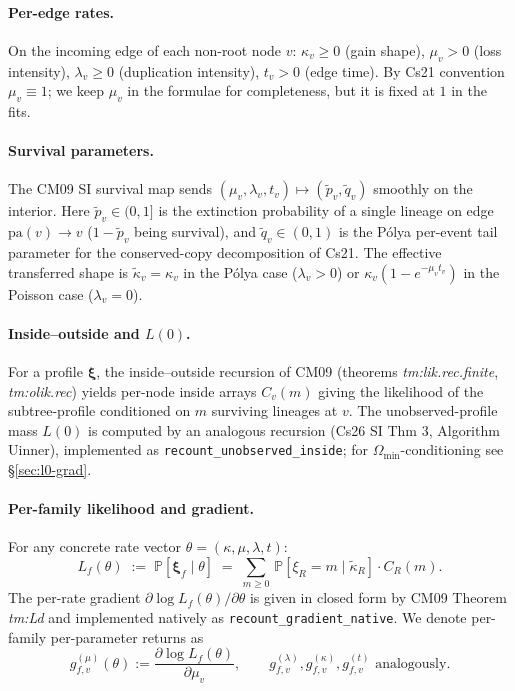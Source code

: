 \documentclass[11pt]{article}
\newcommand{\PROB}{\mathbb{P}}
\newcommand{\pa}{\mathrm{pa}}
\newcommand{\troot}{R}
\newcommand{\Prof}{\boldsymbol{\xi}}
\newcommand{\rate}{\kappa}
\newcommand{\dup}{\lambda}
\newcommand{\loss}{\mu}
\newcommand{\edgelen}{t}
\newcommand{\survp}{\tilde p}
\newcommand{\survq}{\tilde q}
\newcommand{\Om}{\Omega}
\theoremstyle{definition}
\begin{document}
\paragraph{Per-edge rates.}
On the incoming edge of each non-root node $v$:
$\rate_v\ge0$ (gain shape), $\loss_v > 0$ (loss intensity),
$\dup_v\ge 0$ (duplication intensity), $\edgelen_v > 0$ (edge time).
By Cs21 convention $\loss_v \equiv 1$; we keep $\loss_v$ in the
formulae for completeness, but it is fixed at $1$ in the fits.

\paragraph{Survival parameters.}
The CM09 SI survival map sends
$(\loss_v, \dup_v, \edgelen_v) \mapsto (\survp_v, \survq_v)$ smoothly
on the interior. Here $\survp_v \in (0,1]$ is the extinction
probability of a single lineage on edge $\pa(v)\to v$
($1-\survp_v$ being survival), and $\survq_v \in (0,1)$ is the
Pólya per-event tail parameter for the conserved-copy decomposition
of Cs21. The effective transferred shape is
$\tilde\rate_v = \rate_v$ in the Pólya case
($\dup_v > 0$) or $\rate_v(1 - e^{-\loss_v\edgelen_v})$ in the
Poisson case ($\dup_v = 0$).

\paragraph{Inside--outside and $L(0)$.}
For a profile $\Prof$, the inside--outside recursion of CM09
(theorems \emph{tm:lik.rec.finite}, \emph{tm:olik.rec}) yields
per-node inside arrays $C_v(m)$ giving the likelihood of the
subtree-profile conditioned on $m$ surviving lineages at $v$.
The unobserved-profile mass $L(0)$ is computed by an analogous
recursion (Cs26 SI Thm 3, Algorithm Uinner), implemented as
\texttt{recount\_unobserved\_inside}; for $\Om_{\min}$-conditioning
see \S\ref{sec:l0-grad}.

\paragraph{Per-family likelihood and gradient.}
For any concrete rate vector $\theta = (\rate, \loss, \dup, \edgelen)$:
\begin{equation}
L_f(\theta) \;:=\; \PROB[\Prof_f \mid \theta]
\;=\; \sum_{m\ge 0}\,\PROB[\xi_\troot = m \mid \tilde\rate_\troot]
                     \cdot C_\troot(m).
\end{equation}
The per-rate gradient $\partial \log L_f(\theta)/\partial\theta$ is
given in closed form by CM09 Theorem \emph{tm:Ld} and implemented
natively as \texttt{recount\_gradient\_native}. We denote per-family
per-parameter returns as
\begin{equation}
g^{(\loss)}_{f,v}(\theta) := \frac{\partial \log L_f(\theta)}{\partial \loss_v},
\qquad
g^{(\dup)}_{f,v}, g^{(\rate)}_{f,v}, g^{(\edgelen)}_{f,v}
\text{ analogously.}
\label{eq:base-grad-kernel}
\end{equation}
\end{document}
